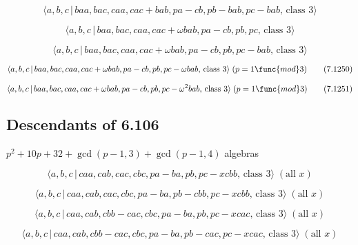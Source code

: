 \documentclass[10pt]{article}
\begin{document}
\begin{equation}
\langle a,b,c\,|\,baa,bac,caa,cac+bab,pa-cb,pb-bab,pc-bab,\,\text{class }%
3\rangle  \tag{7.1247}
\end{equation}

\begin{equation}
\langle a,b,c\,|\,baa,bac,caa,cac+\omega bab,pa-cb,pb,pc,\,\text{class }%
3\rangle  \tag{7.1248}
\end{equation}

\begin{equation}
\langle a,b,c\,|\,baa,bac,caa,cac+\omega bab,pa-cb,pb,pc-bab,\,\text{class }%
3\rangle  \tag{7.1249}
\end{equation}

\begin{equation}
\langle a,b,c\,|\,baa,bac,caa,cac+\omega bab,pa-cb,pb,pc-\omega bab,\,\text{%
class }3\rangle \;(p=1\func{mod}3)  \tag{7.1250}
\end{equation}

\begin{equation}
\langle a,b,c\,|\,baa,bac,caa,cac+\omega bab,pa-cb,pb,pc-\omega ^{2}bab,\,%
\text{class }3\rangle \;(p=1\func{mod}3)  \tag{7.1251}
\end{equation}

\subsection{Descendants of 6.106}

$p^{2}+10p+32+\gcd (p-1,3)+\gcd (p-1,4)$ algebras

\begin{equation}
\langle a,b,c\,|\,caa,cab,cac,cbc,pa-ba,pb,pc-xcbb,\,\text{class }3\rangle
\;(\text{all }x)  \tag{7.1252}
\end{equation}

\begin{equation}
\langle a,b,c\,|\,caa,cab,cac,cbc,pa-ba,pb-cbb,pc-xcbb,\,\text{class }%
3\rangle \;(\text{all }x)  \tag{7.1253}
\end{equation}

\begin{equation}
\langle a,b,c\,|\,caa,cab,cbb-cac,cbc,pa-ba,pb,pc-xcac,\,\text{class }%
3\rangle \;(\text{all }x)  \tag{7.1254}
\end{equation}

\begin{equation}
\langle a,b,c\,|\,caa,cab,cbb-cac,cbc,pa-ba,pb-cac,pc-xcac,\,\text{class }%
3\rangle \;(\text{all }x)  \tag{7.1255}
\end{equation}
\end{document}
